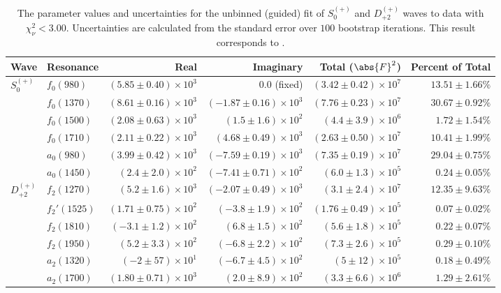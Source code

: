 \begin{table}[ht]
    \begin{center}
        \begin{tabular}{llrrrr}\toprule
        Wave & Resonance & Real & Imaginary & Total ($\abs{F}^2$) & Percent of Total \\\midrule
$S_{0}^{(+)}$ & $f_{0}(980)$ & $(5.85 \pm 0.40) \times 10^{3}$ & $0.0$ (fixed) & $(3.42 \pm 0.42) \times 10^{7}$ & $13.51 \pm 1.66 \%$ \\
 & $f_{0}(1370)$ & $(8.61 \pm 0.16) \times 10^{3}$ & $(-1.87 \pm 0.16) \times 10^{3}$ & $(7.76 \pm 0.23) \times 10^{7}$ & $30.67 \pm 0.92 \%$ \\
 & $f_{0}(1500)$ & $(2.08 \pm 0.63) \times 10^{3}$ & $(1.5 \pm 1.6) \times 10^{2}$ & $(4.4 \pm 3.9) \times 10^{6}$ & $1.72 \pm 1.54 \%$ \\
 & $f_{0}(1710)$ & $(2.11 \pm 0.22) \times 10^{3}$ & $(4.68 \pm 0.49) \times 10^{3}$ & $(2.63 \pm 0.50) \times 10^{7}$ & $10.41 \pm 1.99 \%$ \\
 & $a_{0}(980)$ & $(3.99 \pm 0.42) \times 10^{3}$ & $(-7.59 \pm 0.19) \times 10^{3}$ & $(7.35 \pm 0.19) \times 10^{7}$ & $29.04 \pm 0.75 \%$ \\
 & $a_{0}(1450)$ & $(2.4 \pm 2.0) \times 10^{2}$ & $(-7.41 \pm 0.71) \times 10^{2}$ & $(6.0 \pm 1.3) \times 10^{5}$ & $0.24 \pm 0.05 \%$ \\
$D_{+2}^{(+)}$ & $f_{2}(1270)$ & $(5.2 \pm 1.6) \times 10^{3}$ & $(-2.07 \pm 0.49) \times 10^{3}$ & $(3.1 \pm 2.4) \times 10^{7}$ & $12.35 \pm 9.63 \%$ \\
 & $f_{2}'(1525)$ & $(1.71 \pm 0.75) \times 10^{2}$ & $(-3.8 \pm 1.9) \times 10^{2}$ & $(1.76 \pm 0.49) \times 10^{5}$ & $0.07 \pm 0.02 \%$ \\
 & $f_{2}(1810)$ & $(-3.1 \pm 1.2) \times 10^{2}$ & $(6.8 \pm 1.5) \times 10^{2}$ & $(5.6 \pm 1.8) \times 10^{5}$ & $0.22 \pm 0.07 \%$ \\
 & $f_{2}(1950)$ & $(5.2 \pm 3.3) \times 10^{2}$ & $(-6.8 \pm 2.2) \times 10^{2}$ & $(7.3 \pm 2.6) \times 10^{5}$ & $0.29 \pm 0.10 \%$ \\
 & $a_{2}(1320)$ & $(-2 \pm 57) \times 10^{1}$ & $(-6.7 \pm 4.5) \times 10^{2}$ & $(5 \pm 12) \times 10^{5}$ & $0.18 \pm 0.49 \%$ \\
 & $a_{2}(1700)$ & $(1.80 \pm 0.71) \times 10^{3}$ & $(2.0 \pm 8.9) \times 10^{2}$ & $(3.3 \pm 6.6) \times 10^{6}$ & $1.29 \pm 2.61 \%$ \\\bottomrule
        \end{tabular}
    \caption{The parameter values and uncertainties for the unbinned (guided) fit of $S_{0}^{(+)}$ and $D_{+2}^{(+)}$ waves to data with $\chi^2_\nu < 3.00$. Uncertainties are calculated from the standard error over $100$ bootstrap iterations. This result corresponds to .}\label{tab:unbinned-fit-chisqdof-3.0-guided-Sp0p-Dp2p}
    \end{center}
\end{table}
